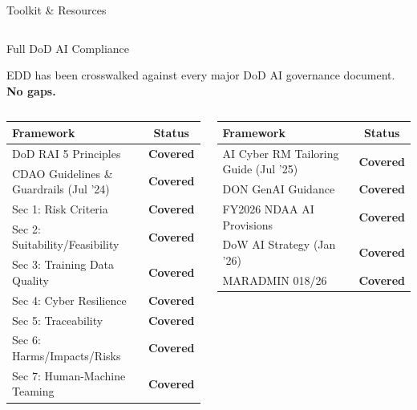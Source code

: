 \documentclass[aspectratio=169,11pt]{beamer}
\newcommand{\grn}[1]{\textbf{\color{dodgreen}#1}}
\begin{document}
\begin{frame}[shrink=10]{Toolkit \& Resources}
\begin{columns}[T]
\end{columns}

\end{frame}

\begin{frame}[shrink=15]{Full DoD AI Compliance}

{\small EDD has been crosswalked against every major DoD AI governance document. \grn{No gaps.}}

\vspace{2pt}

\begin{columns}[T]

\renewcommand{\arraystretch}{1.05}
{\scriptsize
\begin{tabular}{@{}p{4.8cm}c@{}}
\toprule
\textbf{Framework} & \textbf{Status} \\
\midrule
DoD RAI 5 Principles & \grn{Covered} \\
CDAO Guidelines \& Guardrails (Jul '24) & \grn{Covered} \\
\quad Sec 1: Risk Criteria & \grn{Covered} \\
\quad Sec 2: Suitability/Feasibility & \grn{Covered} \\
\quad Sec 3: Training Data Quality & \grn{Covered} \\
\quad Sec 4: Cyber Resilience & \grn{Covered} \\
\quad Sec 5: Traceability & \grn{Covered} \\
\quad Sec 6: Harms/Impacts/Risks & \grn{Covered} \\
\quad Sec 7: Human-Machine Teaming & \grn{Covered} \\
\bottomrule
\end{tabular}
}


{\scriptsize
\begin{tabular}{@{}p{4.8cm}c@{}}
\toprule
\textbf{Framework} & \textbf{Status} \\
\midrule
AI Cyber RM Tailoring Guide (Jul '25) & \grn{Covered} \\
DON GenAI Guidance & \grn{Covered} \\
FY2026 NDAA AI Provisions & \grn{Covered} \\
DoW AI Strategy (Jan '26) & \grn{Covered} \\
MARADMIN 018/26 & \grn{Covered} \\
\bottomrule
\end{tabular}
}


\end{columns}
\end{frame}
\end{document}
